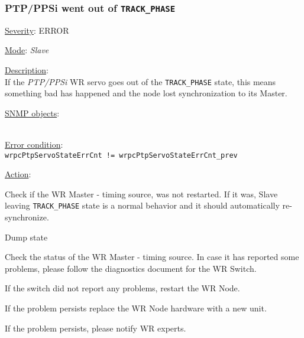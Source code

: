 \subsubsection{\bf PTP/PPSi went out of \texttt{TRACK\_PHASE}}
		\label{fail:timing:ppsi_track_phase}
		\begin{pck_descr}
			\item [] \underline{Severity}: ERROR
			\item [] \underline{Mode}: \emph{Slave}
			\item [] \underline{Description}:\\
				If the \emph{PTP/PPSi} WR servo goes out of the \texttt{TRACK\_PHASE}
				state, this means something bad has happened and the node lost
        synchronization to its Master.
			\item [] \underline{SNMP objects}:\\
				{\footnotesize
				\\
				 }
			\item [] \underline{Error condition}:\\
				{\footnotesize
				\texttt{wrpcPtpServoStateErrCnt != wrpcPtpServoStateErrCnt\_prev} }
      \item [] \underline{Action}:
        \begin{pck_proc}
        \item Check if the WR Master - timing source, was not restarted. If it
          was, Slave leaving \texttt{TRACK\_PHASE} state is a normal behavior
          and it should automatically re-synchronize.
        \item Dump state
        \item Check the status of the WR Master - timing source. In case it has
          reported some problems, please follow the diagnostics document for the
          WR Switch.
        \item If the switch did not report any problems, restart the WR Node.
        \item If the problem persists replace the WR Node hardware with a new
          unit.
        \item If the problem persists, please notify WR experts.
        \end{pck_proc}
		\end{pck_descr}

